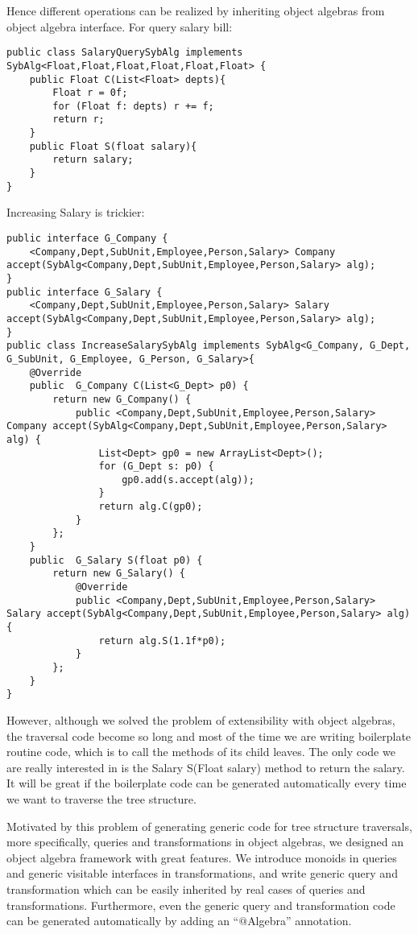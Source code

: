 Hence different operations can be realized by inheriting object algebras from object algebra interface. For query salary bill: 
\begin{lstlisting}
public class SalaryQuerySybAlg implements SybAlg<Float,Float,Float,Float,Float,Float> {
	public Float C(List<Float> depts){
		Float r = 0f;
		for (Float f: depts) r += f;
		return r;
	}
	public Float S(float salary){
		return salary;
	}
}
\end{lstlisting}
Increasing Salary is trickier: 
\begin{lstlisting}
public interface G_Company {
	<Company,Dept,SubUnit,Employee,Person,Salary> Company accept(SybAlg<Company,Dept,SubUnit,Employee,Person,Salary> alg);
}
public interface G_Salary {
	<Company,Dept,SubUnit,Employee,Person,Salary> Salary accept(SybAlg<Company,Dept,SubUnit,Employee,Person,Salary> alg);
}
public class IncreaseSalarySybAlg implements SybAlg<G_Company, G_Dept, G_SubUnit, G_Employee, G_Person, G_Salary>{
	@Override
	public  G_Company C(List<G_Dept> p0) {
		return new G_Company() {
			public <Company,Dept,SubUnit,Employee,Person,Salary> Company accept(SybAlg<Company,Dept,SubUnit,Employee,Person,Salary> alg) {
				List<Dept> gp0 = new ArrayList<Dept>();
				for (G_Dept s: p0) {
					gp0.add(s.accept(alg));
				}
				return alg.C(gp0);
			}
		};
	}
	public  G_Salary S(float p0) {
		return new G_Salary() {
			@Override
			public <Company,Dept,SubUnit,Employee,Person,Salary> Salary accept(SybAlg<Company,Dept,SubUnit,Employee,Person,Salary> alg) {
				return alg.S(1.1f*p0);
			}
		};
	}
}
\end{lstlisting}

However, although we solved the problem of extensibility with object algebras, the traversal code become so long and most of the time we are writing boilerplate routine code, which is to call the methods of its child leaves. The only code we are really interested in is the Salary S(Float salary) method to return the salary. It will be great if the boilerplate code can be generated automatically every time we want to traverse the tree structure. 

Motivated by this problem of generating generic code for tree structure traversals, more specifically, queries and transformations in object algebras, we designed an object algebra framework with great features. We introduce monoids in queries and generic visitable interfaces in transformations, and write generic query and transformation which can be easily inherited by real cases of queries and transformations. Furthermore, even the generic query and transformation code can be generated automatically by adding an ``$@$Algebra'' annotation. 

